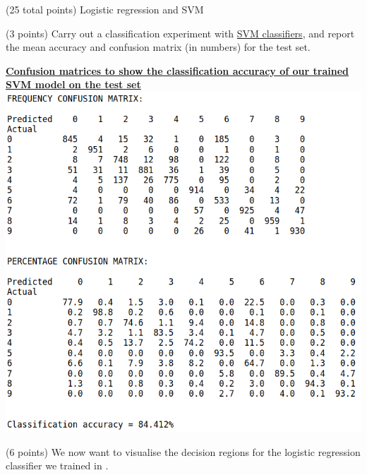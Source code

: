 \documentclass[12pt]{article}
\begin{document}
\begin{question}{(25 total points) Logistic regression and SVM}
\begin{subquestion}
   \end{subquestion}
   \begin{subquestion}{(3 points)
       Carry out a classification experiment with
       \href{https://scikit-learn.org/0.19/modules/generated/sklearn.svm.SVC.html}{SVM classifiers}, and report the
       mean accuracy and confusion matrix (in numbers) for the test
       set.
     } \label{Q2.2}


   

      \begin{answerbox}{40em}
        \begin{center}
        \textbf{\underline{Confusion matrices to show the classification accuracy of our trained}}\\
        \textbf{\underline{SVM model on the test set}}
        \vspace{0.3cm}\\
         \includegraphics[width=1\textwidth]{images/q22.png}
        \end{center}
      \end{answerbox}
  


   \end{subquestion}
   \begin{subquestion}{(6 points)
       We now want to visualise the decision regions for the logistic
       regression classifier we trained in .
     } \label{Q2.3}



\end{subquestion}
\end{question}
\end{document}
